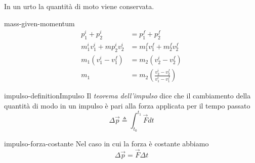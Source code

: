 \documentclass[preview]{standalone}
\begin{document}
\begin{plainhtml}
    In un urto la quantità di moto viene conservata.
\end{plainhtml}

\begin{snippet}{mass-given-momentum}
    \begin{align*}
        p_1^i + p_2^i &= p_1^f + p_2^f \\
        m_1^i v_1^i + mp_2^i  v_2^i &= m_1^f v_1^f + m_2^f v_2^f \\
        m_1 (v_1^i - v_1^f) &= m_2 (v_2^i - v_2^f) \\
        m_1 &= m_2 \left(
            \frac{v_2^i - v_2^f}{v_1^i - v_1^f}
        \right)
    \end{align*}
\end{snippet}

\begin{snippetdefinition}{impulso-definition}{Impulso}
    Il \textit{teorema dell'impulso}
    dice che il cambiamento della quantità di modo in un impulso
    è pari alla forza applicata per il tempo passato
    \[
        \Delta \vec{p} \triangleq \int_{t_0}^{t_1} \vec{F} dt    
    \]
\end{snippetdefinition}

\begin{snippet}{impulso-forza-costante}
    Nel caso in cui la forza è costante abbiamo
    \[
        \Delta \vec{p} = \vec{F}\Delta t
    \]
\end{snippet}

\end{document}
